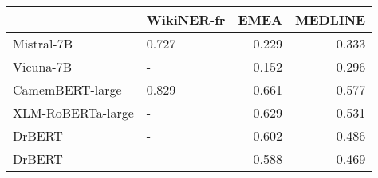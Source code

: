 \begin{tabular}{llrr}
\toprule
 & WikiNER-fr & EMEA & MEDLINE \\
\midrule
Mistral-7B & 0.727 & 0.229 & 0.333 \\
Vicuna-7B & - & 0.152 & 0.296 \\
CamemBERT-large & 0.829 & 0.661 & 0.577 \\
XLM-RoBERTa-large & - & 0.629 & 0.531 \\
DrBERT & - & 0.602 & 0.486 \\
DrBERT & - & 0.588 & 0.469 \\
\bottomrule
\end{tabular}
